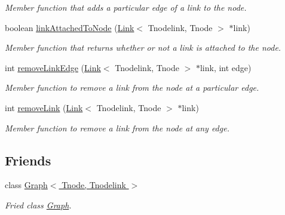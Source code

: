 \begin{DoxyCompactItemize}
\begin{DoxyCompactList}\small\item\em Member function that adds a particular edge of a link to the node. \end{DoxyCompactList}\item 
boolean \hyperlink{classNode_a9237bd16a22ee02c244d8cc95d6533bd}{link\+Attached\+To\+Node} (\hyperlink{classLink}{Link}$<$ Tnodelink, Tnode $>$ $\ast$link)
\begin{DoxyCompactList}\small\item\em Member function that returns whether or not a link is attached to the node. \end{DoxyCompactList}\item 
\hypertarget{classNode_ad469f4b48294f360d372b5765eee4f77}{int \hyperlink{classNode_ad469f4b48294f360d372b5765eee4f77}{remove\+Link\+Edge} (\hyperlink{classLink}{Link}$<$ Tnodelink, Tnode $>$ $\ast$link, int edge)}\label{classNode_ad469f4b48294f360d372b5765eee4f77}

\begin{DoxyCompactList}\small\item\em Member function to remove a link from the node at a particular edge. \end{DoxyCompactList}\item 
int \hyperlink{classNode_aa7a762ea839eea52e9d2cae7f31780e8}{remove\+Link} (\hyperlink{classLink}{Link}$<$ Tnodelink, Tnode $>$ $\ast$link)
\begin{DoxyCompactList}\small\item\em Member function to remove a link from the node at any edge. \end{DoxyCompactList}\end{DoxyCompactItemize}
\subsection*{Friends}
\begin{DoxyCompactItemize}
\item 
\hypertarget{classNode_a73e2a6b342470c352a5bd3843e75d475}{class \hyperlink{classNode_a73e2a6b342470c352a5bd3843e75d475}{Graph$<$ Tnode, Tnodelink $>$}}\label{classNode_a73e2a6b342470c352a5bd3843e75d475}

\begin{DoxyCompactList}\small\item\em Fried class \hyperlink{classGraph}{Graph}. \end{DoxyCompactList}\end{DoxyCompactItemize}


